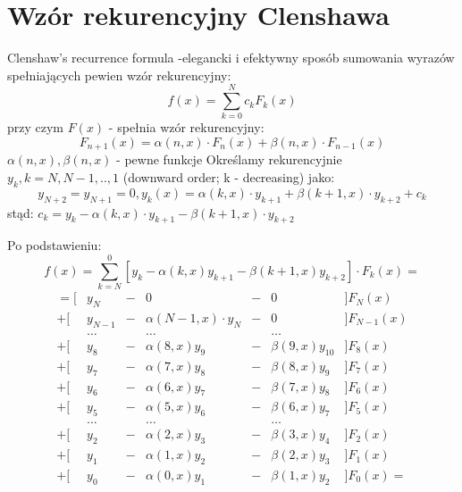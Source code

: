 \section{Wzór rekurencyjny Clenshawa}
\begin{frame}{Clenshaw's recurrence formula}
	-elegancki i efektywny sposób sumowania wyrazów spełniających pewien wzór rekurencyjny:
    $$f(x) = \sum_{k=0}^{N}c_kF_k(x)$$
    przy czym $F(x)$ - spełnia wzór rekurencyjny:
    $$F_{n+1}(x) = \alpha(n,x) \cdot F_n(x) + \beta(n,x) \cdot F_{n-1}(x)$$
    $\alpha(n,x),\beta(n,x)$ - pewne funkcje\newline
    Określamy rekurencyjnie $y_k,k = N,N-1,..,1$ (downward order; k - decreasing) jako:
    $$y_{N+2}=y_{N+1} = 0, y_k(x) = \alpha(k,x) \cdot y_{k+1}+\beta(k+1,x) \cdot y_{k+2}+c_k$$
    stąd: $c_k = y_k - \alpha(k,x) \cdot y_{k+1} - \beta(k+1,x) \cdot y_{k+2}$ \newline
\end{frame} 
\begin{frame}
	Po podstawieniu:
    $$f(x) = \sum_{k=N}^{0}[y_k-\alpha(k,x)y_{k+1}-\beta(k+1,x)y_{k+2}] \cdot F_k(x) = $$
    $$\left.\begin{array}{rcccccl}
    	=[ & y_N & - & 0 & - & 0 & ] F_N(x) \\
        +[ &y_{N-1}& - & \alpha(N-1,x)\cdot y_N & - & 0 & ] F_{N-1}(x) \\
         & \ldots & & \ldots & & \ldots & \\
         +[ & y_8 & - & \alpha(8,x)y_9 & - & \beta(9,x)y_{10} & ] F_8(x) \\
		+[ & y_7 & - & \alpha(7,x)y_8 & - & \beta(8,x)y_9 & ] F_7(x) \\
        +[ & y_6 & - & \alpha(6,x)y_7 & - & \beta(7,x)y_8 & ] F_6(x) \\
        +[ & y_5 & - & \alpha(5,x)y_6 & - & \beta(6,x)y_7 & ] F_5(x) \\
         & \ldots & & \ldots & & \ldots & \\
		+[ & y_2 & - & \alpha(2,x)y_3 & - & \beta(3,x)y_4 & ] F_2(x) \\
        +[ & y_1 & - & \alpha(1,x)y_2 & - & \beta(2,x)y_3 & ] F_1(x) \\
        +[ & y_0 & - & \alpha(0,x)y_1 & - & \beta(1,x)y_2 & ] F_0(x) =
    \end{array}\right.$$
\end{frame}
